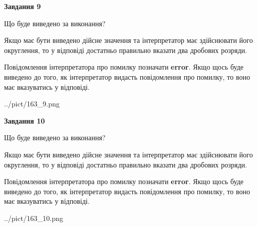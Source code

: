 \documentclass[12pt, ukrainian]{article}
\begin{document}
{\begin {Large}
{\begin {center}\textbf{Завдання 9}\end {center}}\par
Що буде виведено за виконання? \par

Якщо має бути виведено дійсне значення та інтерпретатор має здійснювати його округлення, 
то у відповіді достатньо правильно вказати два дробових розряди.

Повідомлення інтерпретатора про помилку позначати \textbf{error}.
Якщо щось буде виведено до того, як інтерпретатор видасть повідомлення про помилку, 
то воно має вказуватись у відповіді. \par

\begin{center}
	{../pict/163_9.png}
\end{center}
\newpage

{\begin {center}\textbf{Завдання 10}\end {center}}\par
Що буде виведено за виконання? \par

Якщо має бути виведено дійсне значення та інтерпретатор має здійснювати його округлення, 
то у відповіді достатньо правильно вказати два дробових розряди.

Повідомлення інтерпретатора про помилку позначати \textbf{error}.
Якщо щось буде виведено до того, як інтерпретатор видасть повідомлення про помилку, 
то воно має вказуватись у відповіді. \par

\begin{center}
	{../pict/163_10.png}
\end{center}
\newpage

\end {Large}}
\end{document}
